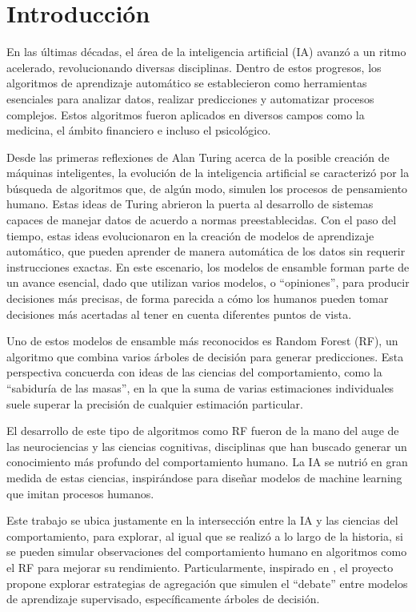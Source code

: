 %
\chapter{Introducción}
\label{ch::capitulo1}

En las últimas décadas, el área de la inteligencia artificial (IA) avanzó a un ritmo acelerado, revolucionando diversas disciplinas. Dentro de estos progresos, los algoritmos de aprendizaje automático se establecieron como herramientas esenciales para analizar datos, realizar predicciones y automatizar procesos complejos. Estos algoritmos fueron aplicados en diversos campos como la medicina, el ámbito financiero e incluso el psicológico.

Desde las primeras reflexiones de Alan Turing acerca de la posible creación de máquinas inteligentes, la evolución de la inteligencia artificial se caracterizó por la búsqueda de algoritmos que, de algún modo, simulen los procesos de pensamiento humano. Estas ideas de Turing abrieron la puerta al desarrollo de sistemas capaces de manejar datos de acuerdo a normas preestablecidas. Con el paso del tiempo, estas ideas evolucionaron en la creación de modelos de aprendizaje automático, que pueden aprender de manera automática de los datos sin requerir instrucciones exactas. En este escenario, los modelos de ensamble forman parte de un avance esencial, dado que utilizan varios modelos, o “opiniones”, para producir decisiones más precisas, de forma parecida a cómo los humanos pueden tomar decisiones más acertadas al tener en cuenta diferentes puntos de vista.

Uno de estos modelos de ensamble más reconocidos es Random Forest (RF), un algoritmo que combina varios árboles de decisión para generar predicciones. Esta perspectiva concuerda con ideas de las ciencias del comportamiento, como la “sabiduría de las masas”, en la que la suma de varias estimaciones individuales suele superar la precisión de cualquier estimación particular. 

El desarrollo de este tipo de algoritmos como RF fueron de la mano del auge de las neurociencias y las ciencias cognitivas, disciplinas que han buscado generar un conocimiento más profundo del comportamiento humano. La IA se nutrió en gran medida de estas ciencias, inspirándose para diseñar modelos de machine learning que imitan procesos humanos. 

Este trabajo se ubica justamente en la intersección entre la IA y las ciencias del comportamiento, para explorar, al igual que se realizó a lo largo de la historia, si se pueden simular observaciones del comportamiento humano en algoritmos como el RF para mejorar su rendimiento. Particularmente, inspirado en \cite{navajasAggregatedKnowledge}, el proyecto propone explorar estrategias de agregación que simulen el “debate” entre modelos de aprendizaje supervisado, específicamente árboles de decisión.

